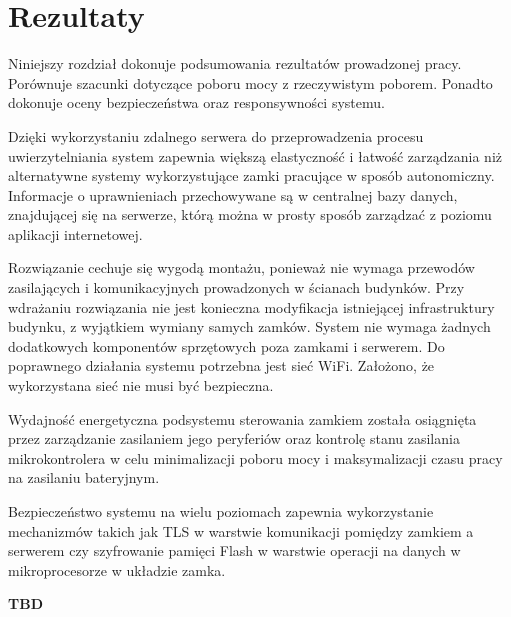 \chapter{Rezultaty}
\label{chap:results}

	Niniejszy rozdział dokonuje podsumowania rezultatów prowadzonej pracy. Porównuje szacunki dotyczące poboru mocy z rzeczywistym poborem. Ponadto dokonuje oceny bezpieczeństwa oraz responsywności systemu.

	Dzięki wykorzystaniu zdalnego serwera do przeprowadzenia procesu uwierzytelniania system zapewnia większą elastyczność i łatwość zarządzania niż alternatywne systemy wykorzystujące zamki pracujące w sposób autonomiczny. Informacje o uprawnieniach przechowywane są w centralnej bazy danych, znajdującej się na serwerze, którą można w prosty sposób zarządzać z poziomu aplikacji internetowej.

	Rozwiązanie cechuje się wygodą montażu, ponieważ nie wymaga przewodów zasilających i komunikacyjnych prowadzonych w ścianach budynków. Przy wdrażaniu rozwiązania nie jest konieczna modyfikacja istniejącej infrastruktury budynku, z wyjątkiem wymiany samych zamków. System nie wymaga żadnych dodatkowych komponentów sprzętowych poza zamkami i serwerem. Do poprawnego działania systemu potrzebna jest sieć WiFi. Założono, że wykorzystana sieć nie musi być bezpieczna.

	Wydajność energetyczna podsystemu sterowania zamkiem została osiągnięta przez zarządzanie zasilaniem jego peryferiów oraz kontrolę stanu zasilania mikrokontrolera w celu minimalizacji poboru mocy i maksymalizacji czasu pracy na zasilaniu bateryjnym.

	Bezpieczeństwo systemu na wielu poziomach zapewnia wykorzystanie mechanizmów takich jak TLS w warstwie komunikacji pomiędzy zamkiem a serwerem czy szyfrowanie pamięci Flash w warstwie operacji na danych w mikroprocesorze w układzie zamka.

	\textbf{TBD}